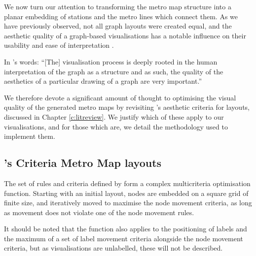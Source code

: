 We now turn our attention to transforming the metro map structure into a planar embedding of stations and the metro lines which connect them. As we have previously observed, not all graph layouts were created equal, and the aesthetic quality of a graph-based visualisations has a notable influence on their usability and ease of interpretation \citep{TheBasisForGraphDrawingAlgorithms, WhichAesthetic, AutomaticMetroMapLayoutThesis, AutomaticMetroMapLayout}. 

In \citeauthor{AutomaticMetroMapLayoutThesis}'s words: ``[The] visualisation process is deeply rooted in the human interpretation of the graph as a structure and as such, the quality of the aesthetics of a particular drawing of a graph are very important.'' \citep[p.24]{AutomaticMetroMapLayoutThesis}

We therefore devote a significant amount of thought to optimising the visual quality of the generated metro maps by revisiting \citeauthor{AutomaticMetroMapLayoutThesis}'s aesthetic criteria for layouts, discussed in Chapter \ref{c:litreview}. We justify which of these apply to our visualisations, and for those which are, we detail the methodology used to implement them.

\subsection{\citeauthor{AutomaticMetroMapLayoutThesis}'s Criteria Metro Map layouts}

The set of rules and criteria defined by \cite{AutomaticMetroMapLayoutThesis} form a complex multicriteria optimisation function. Starting with an initial layout, nodes are embedded on a square grid of finite size, and iteratively moved to maximise the node movement criteria, as long as movement does not violate one of the node movement rules.

It should be noted that the function also applies to the positioning of labels and the maximum of a set of label movement criteria alongside the node movement criteria, but as visualisations are unlabelled, these will not be described.

